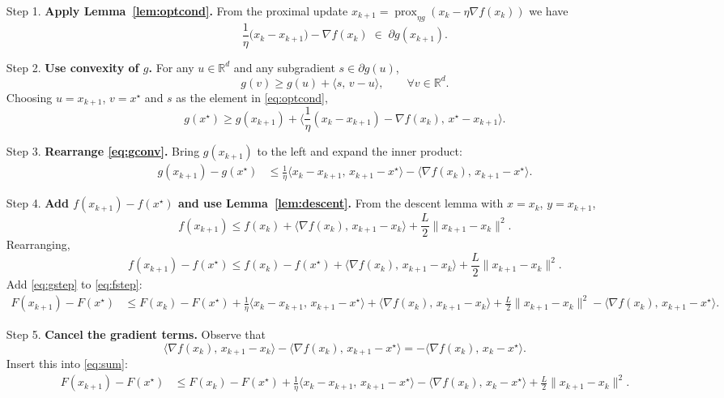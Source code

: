 \documentclass{article}
\newcommand{\prox}{\operatorname{prox}}
\newcommand{\R}{\mathbb{R}}
\begin{document}
\begin{enumerate}
\item[Step 1.] \textbf{Apply Lemma~\ref{lem:optcond}.}  
From the proximal update $x_{k+1}=\prox_{\eta g}(x_{k}-\eta\nabla f(x_{k}))$ we have
\begin{equation}
\frac{1}{\eta}\bigl(x_{k}-x_{k+1}\bigr)-\nabla f(x_{k})\;\in\;\partial g(x_{k+1}).
\label{eq:optcond}
\end{equation}

\item[Step 2.] \textbf{Use convexity of $g$.}  
For any $u\in\R^{d}$ and any subgradient $s\in\partial g(u)$,
\[
g(v)\ge g(u)+\langle s,\,v-u\rangle,\qquad\forall v\in\R^{d}.
\]
Choosing $u=x_{k+1}$, $v=x^{\star}$ and $s$ as the element in \eqref{eq:optcond},
\begin{equation}
g(x^{\star})\ge g(x_{k+1})+\Big\langle\frac{1}{\eta}(x_{k}-x_{k+1})-\nabla f(x_{k}),\,x^{\star}-x_{k+1}\Big\rangle.
\label{eq:gconv}
\end{equation}

\item[Step 3.] \textbf{Rearrange \eqref{eq:gconv}.}  
Bring $g(x_{k+1})$ to the left and expand the inner product:
\begin{align}
g(x_{k+1})-g(x^{\star}) 
&\le \frac{1}{\eta}\langle x_{k}-x_{k+1},\,x_{k+1}-x^{\star}\rangle
    -\langle\nabla f(x_{k}),\,x_{k+1}-x^{\star}\rangle.
\label{eq:gstep}
\end{align}

\item[Step 4.] \textbf{Add $f(x_{k+1})-f(x^{\star})$ and use Lemma~\ref{lem:descent}.}  
From the descent lemma with $x=x_{k}$, $y=x_{k+1}$,
\[
f(x_{k+1})\le f(x_{k})+\langle\nabla f(x_{k}),\,x_{k+1}-x_{k}\rangle
           +\frac{L}{2}\|x_{k+1}-x_{k}\|^{2}.
\]
Rearranging,
\begin{equation}
f(x_{k+1})-f(x^{\star})
\le f(x_{k})-f(x^{\star})+\langle\nabla f(x_{k}),\,x_{k+1}-x_{k}\rangle
   +\frac{L}{2}\|x_{k+1}-x_{k}\|^{2}.
\label{eq:fstep}
\end{equation}
Add \eqref{eq:gstep} to \eqref{eq:fstep}:
\begin{align}
F(x_{k+1})-F(x^{\star})
&\le F(x_{k})-F(x^{\star})
   +\frac{1}{\eta}\langle x_{k}-x_{k+1},\,x_{k+1}-x^{\star}\rangle
   +\langle\nabla f(x_{k}),\,x_{k+1}-x_{k}\rangle
   +\frac{L}{2}\|x_{k+1}-x_{k}\|^{2}
   -\langle\nabla f(x_{k}),\,x_{k+1}-x^{\star}\rangle.
\label{eq:sum}
\end{align}

\item[Step 5.] \textbf{Cancel the gradient terms.}  
Observe that
\[
\langle\nabla f(x_{k}),\,x_{k+1}-x_{k}\rangle
-\langle\nabla f(x_{k}),\,x_{k+1}-x^{\star}\rangle
= -\langle\nabla f(x_{k}),\,x_{k}-x^{\star}\rangle .
\]
Insert this into \eqref{eq:sum}:
\begin{align}
F(x_{k+1})-F(x^{\star})
&\le F(x_{k})-F(x^{\star})
   +\frac{1}{\eta}\langle x_{k}-x_{k+1},\,x_{k+1}-x^{\star}\rangle
   -\langle\nabla f(x_{k}),\,x_{k}-x^{\star}\rangle
   +\frac{L}{2}\|x_{k+1}-x_{k}\|^{2}.
\label{eq:mid}
\end{align}


\end{enumerate}
\end{document}
